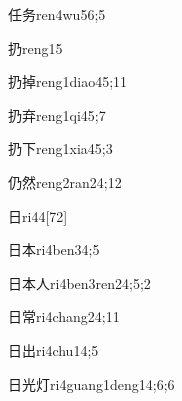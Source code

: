 \begin{verbete}{任务}{ren4wu5}{6;5}
\end{verbete}

\begin{verbete}{扔}{reng1}{5}
\end{verbete}

\begin{verbete}{扔掉}{reng1diao4}{5;11}
\end{verbete}

\begin{verbete}{扔弃}{reng1qi4}{5;7}
\end{verbete}

\begin{verbete}{扔下}{reng1xia4}{5;3}
\end{verbete}

\begin{verbete}{仍然}{reng2ran2}{4;12}
\end{verbete}

\begin{verbete}{日}{ri4}{4}[72]
\end{verbete}

\begin{verbete}{日本}{ri4ben3}{4;5}
\end{verbete}

\begin{verbete}{日本人}{ri4ben3ren2}{4;5;2}
\end{verbete}

\begin{verbete}{日常}{ri4chang2}{4;11}
\end{verbete}

\begin{verbete}{日出}{ri4chu1}{4;5}
\end{verbete}

\begin{verbete}{日光灯}{ri4guang1deng1}{4;6;6}
\end{verbete}

